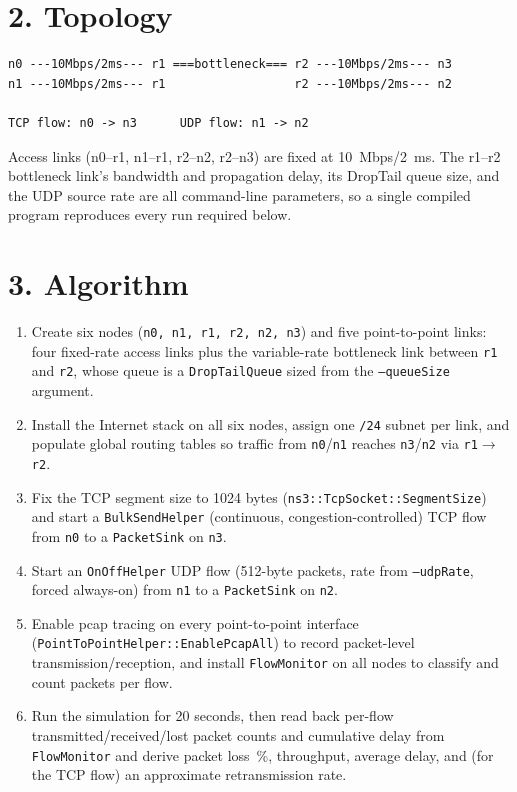 \documentclass[11pt]{article}
\begin{document}
\section*{2. Topology}
\begin{center}
\begin{verbatim}
n0 ---10Mbps/2ms--- r1 ===bottleneck=== r2 ---10Mbps/2ms--- n3
n1 ---10Mbps/2ms--- r1                  r2 ---10Mbps/2ms--- n2

TCP flow: n0 -> n3      UDP flow: n1 -> n2
\end{verbatim}
\end{center}
Access links (n0--r1, n1--r1, r2--n2, r2--n3) are fixed at 10~Mbps/2~ms. The
r1--r2 bottleneck link's bandwidth and propagation delay, its DropTail queue
size, and the UDP source rate are all command-line parameters, so a single
compiled program reproduces every run required below.

\section*{3. Algorithm}
\begin{enumerate}
  \item Create six nodes (\texttt{n0, n1, r1, r2, n2, n3}) and five
        point-to-point links: four fixed-rate access links plus the
        variable-rate bottleneck link between \texttt{r1} and \texttt{r2},
        whose queue is a \texttt{DropTailQueue} sized from the
        \texttt{--queueSize} argument.
  \item Install the Internet stack on all six nodes, assign one \texttt{/24}
        subnet per link, and populate global routing tables so traffic from
        \texttt{n0}/\texttt{n1} reaches \texttt{n3}/\texttt{n2} via
        \texttt{r1}$\to$\texttt{r2}.
  \item Fix the TCP segment size to 1024 bytes
        (\texttt{ns3::TcpSocket::SegmentSize}) and start a
        \texttt{BulkSendHelper} (continuous, congestion-controlled) TCP flow
        from \texttt{n0} to a \texttt{PacketSink} on \texttt{n3}.
  \item Start an \texttt{OnOffHelper} UDP flow (512-byte packets, rate from
        \texttt{--udpRate}, forced always-on) from \texttt{n1} to a
        \texttt{PacketSink} on \texttt{n2}.
  \item Enable pcap tracing on every point-to-point interface
        (\texttt{PointToPointHelper::EnablePcapAll}) to record packet-level
        transmission/reception, and install \texttt{FlowMonitor} on all
        nodes to classify and count packets per flow.
  \item Run the simulation for 20 seconds, then read back per-flow
        transmitted/received/lost packet counts and cumulative delay from
        \texttt{FlowMonitor} and derive packet loss~\%, throughput, average
        delay, and (for the TCP flow) an approximate retransmission rate.
\end{enumerate}
\end{document}
